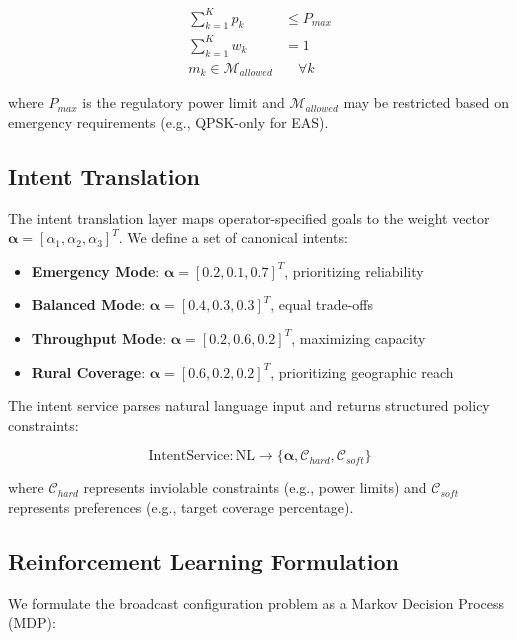 \documentclass[conference]{IEEEtran}
\begin{document}
\begin{align}
\sum_{k=1}^{K} p_k &\leq P_{max} \\
\sum_{k=1}^{K} w_k &= 1 \\
m_k \in \mathcal{M}_{allowed} &\quad \forall k
\end{align}

where $P_{max}$ is the regulatory power limit and $\mathcal{M}_{allowed}$ may be restricted based on emergency requirements (e.g., QPSK-only for EAS).

\subsection{Intent Translation}

The intent translation layer maps operator-specified goals to the weight vector $\boldsymbol{\alpha} = [\alpha_1, \alpha_2, \alpha_3]^T$. We define a set of canonical intents:

\begin{itemize}
\item \textbf{Emergency Mode}: $\boldsymbol{\alpha} = [0.2, 0.1, 0.7]^T$, prioritizing reliability
\item \textbf{Balanced Mode}: $\boldsymbol{\alpha} = [0.4, 0.3, 0.3]^T$, equal trade-offs
\item \textbf{Throughput Mode}: $\boldsymbol{\alpha} = [0.2, 0.6, 0.2]^T$, maximizing capacity
\item \textbf{Rural Coverage}: $\boldsymbol{\alpha} = [0.6, 0.2, 0.2]^T$, prioritizing geographic reach
\end{itemize}

The intent service parses natural language input and returns structured policy constraints:

\begin{equation}
\text{IntentService}: \text{NL} \rightarrow \{\boldsymbol{\alpha}, \mathcal{C}_{hard}, \mathcal{C}_{soft}\}
\end{equation}

where $\mathcal{C}_{hard}$ represents inviolable constraints (e.g., power limits) and $\mathcal{C}_{soft}$ represents preferences (e.g., target coverage percentage).

\subsection{Reinforcement Learning Formulation}

We formulate the broadcast configuration problem as a Markov Decision Process (MDP):
\end{document}
